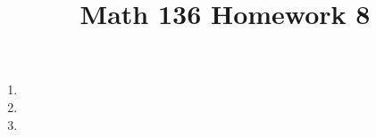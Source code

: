 \documentclass{article}
\title{Math 136 Homework 8}
\begin{document}
    \maketitle
    \begin{enumerate}
      \item 
      \item 
      \item 
    \end{enumerate}
\end{document}
